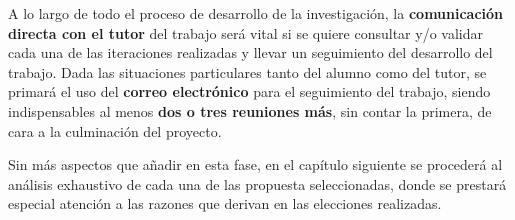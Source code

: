 A lo largo de todo el proceso de desarrollo de la investigación, la \textbf{comunicación directa con el tutor} del trabajo será vital si se quiere consultar y/o validar cada una de las iteraciones realizadas y llevar un seguimiento del desarrollo del trabajo. Dada las situaciones particulares tanto del alumno como del tutor, se primará el uso del \textbf{correo electrónico} para el seguimiento del trabajo, siendo indispensables al menos \textbf{dos o tres reuniones más}, sin contar la primera, de cara a la culminación del proyecto.

Sin más aspectos que añadir en esta fase, en el capítulo siguiente se procederá al análisis exhaustivo de cada una de las propuesta seleccionadas, donde se prestará especial atención a las razones que derivan en las elecciones realizadas.





